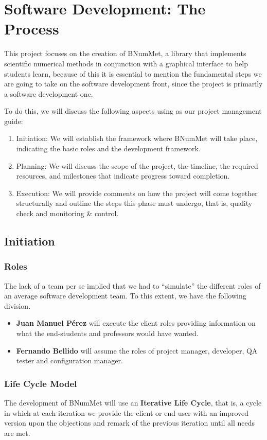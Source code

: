 \chapter{Software Development: The Process}
This project focuses on the creation of BNumMet, a library that implements scientific numerical methods in conjunction with a graphical interface to help students learn, because of this it is essential to mention the fundamental steps we are going to take on the software development front, since the project is primarily a software development one. 

To do this, we will discuss the following aspects using \cite{PMBOK2013} as our project management guide:
\begin{enumerate}
    \item Initiation: We will establish the framework where BNumMet will take place, indicating the basic roles and the development framework.
    \item Planning: We will discuss the scope of the project, the timeline, the required resources, and milestones that indicate progress toward completion.
    \item Execution: We will provide comments on how the project will come together structurally and outline the steps this phase must undergo, that is, quality check and monitoring \& control.
\end{enumerate}


\section{Initiation}
\subsection{Roles}
The lack of a team per se implied that we had to ``simulate'' the different roles of an average software development team.
To this extent, we have the following division.
\begin{itemize}
    \item \textbf{Juan Manuel Pérez} will execute the client roles providing information on what the end-students and professors would have wanted.
    \item \textbf{Fernando Bellido} will assume the roles of project manager, developer, QA tester and configuration manager.
\end{itemize}

\subsection{Life Cycle Model}
The development of BNumMet will use an \textbf{Iterative Life Cycle}, that is, a cycle in which at each iteration we provide the client or end user with an improved version upon the objections and remark of the previous iteration until all needs are met.

